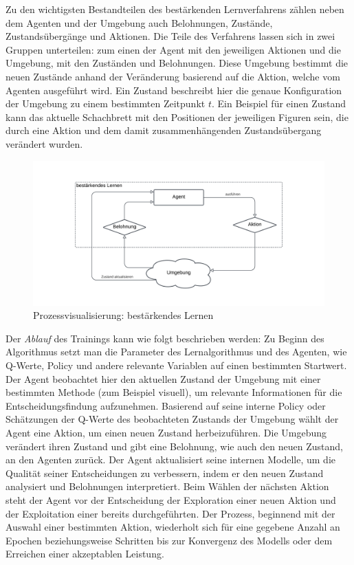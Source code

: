 Zu den wichtigsten Bestandteilen des bestärkenden Lernverfahrens zählen neben dem Agenten und der Umgebung auch Belohnungen, Zustände, Zustandsübergänge und Aktionen. Die Teile des Verfahrens lassen sich in zwei Gruppen unterteilen: zum einen der Agent mit den jeweiligen Aktionen und die Umgebung, mit den Zuständen und Belohnungen. Diese Umgebung bestimmt die neuen Zustände anhand der Veränderung basierend auf die Aktion, welche vom Agenten ausgeführt wird. Ein Zustand beschreibt hier die genaue Konfiguration der Umgebung zu einem bestimmten Zeitpunkt $t$. Ein Beispiel für einen Zustand kann das aktuelle Schachbrett mit den Positionen der jeweiligen Figuren sein, die durch eine Aktion und dem damit zusammenhängenden Zustandsübergang verändert wurden.
\begin{figure}[H]\label{img:reinforcementworkflow}
	\hspace{-10mm}
	\centering
	\includegraphics[width=0.8\linewidth]{Bilder/ReinforcementLearning.png}
	\caption{Prozessvisualisierung: bestärkendes Lernen}
\end{figure}
Der \textit{Ablauf} des Trainings kann wie folgt beschrieben werden: Zu Beginn des Algorithmus setzt man die Parameter des Lernalgorithmus und des Agenten, wie Q-Werte, Policy und andere relevante Variablen auf einen bestimmten Startwert. Der Agent beobachtet hier den aktuellen Zustand der Umgebung mit einer bestimmten Methode (zum Beispiel visuell), um relevante Informationen für die Entscheidungsfindung aufzunehmen. Basierend auf seine interne Policy oder Schätzungen der Q-Werte des beobachteten Zustands der Umgebung wählt der Agent eine Aktion, um einen neuen Zustand herbeizuführen. Die Umgebung verändert ihren Zustand und gibt eine Belohnung, wie auch den neuen Zustand, an den Agenten zurück. Der Agent aktualisiert seine internen Modelle, um die Qualität seiner Entscheidungen zu verbessern, indem er den neuen Zustand analysiert und Belohnungen interpretiert. Beim Wählen der nächsten Aktion steht der Agent vor der Entscheidung der Exploration einer neuen Aktion und der Exploitation einer bereits durchgeführten. Der Prozess, beginnend mit der Auswahl einer bestimmten Aktion, wiederholt sich für eine gegebene Anzahl an Epochen beziehungsweise Schritten bis zur Konvergenz des Modells oder dem Erreichen einer akzeptablen Leistung.

